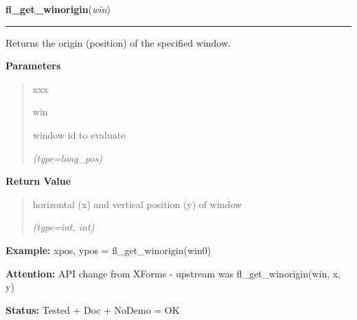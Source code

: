 \hspace{.8\funcindent}\begin{boxedminipage}{\funcwidth}

    \raggedright \textbf{fl\_get\_winorigin}(\textit{win})

    \vspace{-1.5ex}

    \rule{\textwidth}{0.5\fboxrule}
\setlength{\parskip}{2ex}
    Returns the origin (position) of the specified window.

\setlength{\parskip}{1ex}
      \textbf{Parameters}
      \vspace{-1ex}

      \begin{quote}
        \begin{Ventry}{xxx}

          \item[win]

          window id to evaluate

            {\it (type=long\_pos)}

        \end{Ventry}

      \end{quote}

      \textbf{Return Value}
    \vspace{-1ex}

      \begin{quote}
      horizontal (x) and vertical position (y) of window

      {\it (type=int, int)}

      \end{quote}

\textbf{Example:} xpos, ypos = fl\_get\_winorigin(win0)



\textbf{Attention:} API change from XForms - upstream was fl\_get\_winorigin(win, x, y)



\textbf{Status:} Tested + Doc + NoDemo = OK



    \end{boxedminipage}

    \label{xformslib:flxbasic:fl_get_wingeometry}

    \vspace{0.5ex}

